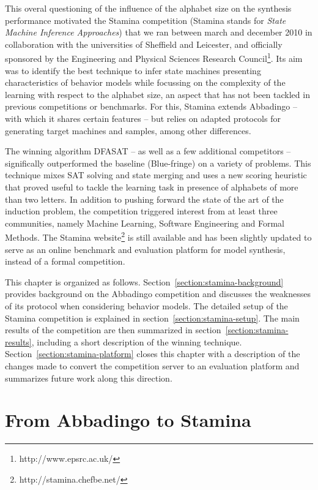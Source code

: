 This overal questioning of the influence of the alphabet size on the synthesis performance motivated the Stamina competition (Stamina stands for \emph{State Machine Inference Approaches}) that we ran between march and december 2010 in collaboration with the universities of Sheffield and Leicester, and officially sponsored by the Engineering and Physical Sciences Research Council\footnote{http://www.epsrc.ac.uk/}. Its aim was to identify the best technique to infer state machines presenting characteristics of behavior models while focussing on the complexity of the learning with respect to the alphabet size, an aspect that has not been tackled in previous competitions or benchmarks. For this, Stamina extends Abbadingo -- with which it shares certain features -- but relies on adapted protocols for generating target machines and samples, among other differences. 

The winning algorithm DFASAT -- as well as a few additional competitors -- significally outperformed the baseline (Blue-fringe) on a variety of problems. This technique mixes SAT solving and state merging and uses a new scoring heuristic that proved useful to tackle the learning task in presence of alphabets of more than two letters. In addition to pushing forward the state of the art of the induction problem, the competition triggered interest from at least three communities, namely Machine Learning, Software Engineering and Formal Methods. The Stamina website\footnote{http://stamina.chefbe.net/} is still available and has been slightly updated to serve as an online benchmark and evaluation platform for model synthesis, instead of a formal competition.

This chapter is organized as follows. Section~\ref{section:stamina-background} provides background on the Abbadingo competition and discusses the weaknesses of its protocol when considering behavior models. The detailed setup of the Stamina competition is explained in section~\ref{section:stamina-setup}. The main results of the competition are then summarized in section~\ref{section:stamina-results}, including a short description of the winning technique. Section~\ref{section:stamina-platform} closes this chapter with a description of the changes made to convert the competition server to an evaluation platform and summarizes future work along this direction.

\section{From Abbadingo to Stamina\label{section:stamina-background}}

